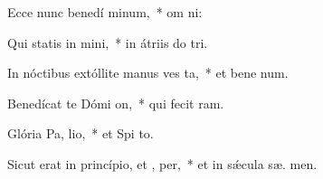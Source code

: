 \item Ecce nunc benedí minum,~* om  ni:
\item Qui statis in  mini,~* in átriis do  tri.
\item In nóctibus extóllite manus ves  ta,~* et bene num.
\item Benedícat te Dómi  on,~* qui fecit   ram.
\item Glória Pa,  lio,~* et Spi to.
\item Sicut erat in princípio, et ,  per,~* et in sǽcula sæ. men.
